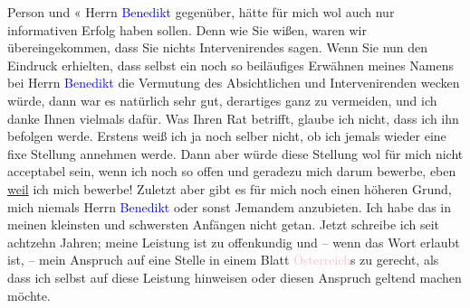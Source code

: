                Person und \label{K_L03553-3v}\label{K_L03553-3h}« Herrn
                  \textcolor{blue}{Benedikt}{}\ledrightnote{\textcolor{blue}{Moriz Benedikt}} gegenüber, hätte für mich wol auch
               nur informativen Erfolg haben sollen. Denn wie Sie wißen, waren wir übereingekommen,
               dass Sie nichts Intervenirendes sagen. Wenn Sie nun den Eindruck erhielten, dass
               selbst ein noch so beiläufiges Erwähnen meines Namens bei Herrn \textcolor{blue}{Benedikt}{}\ledrightnote{\textcolor{blue}{Moriz Benedikt}} die Vermutung des Absichtlichen und Intervenirenden
               wecken würde, dann war es natürlich sehr gut, derartiges ganz zu vermeiden, und ich
               danke Ihnen vielmals dafür. Was Ihren Rat betrifft, glaube ich nicht, dass ich ihn
               befolgen werde. Erstens weiß ich ja noch selber nicht, ob ich jemals wieder eine fixe
                  {\pb}Stellung annehmen werde.
               Dann aber würde diese Stellung wol für mich nicht acceptabel sein, wenn ich noch so
               offen und geradezu mich darum bewerbe, {\dotstwo} eben \uline{weil} ich mich bewerbe! Zuletzt aber gibt es für mich
               noch einen höheren Grund, mich \strikeout{\textcolor{gray}{×}\-\textcolor{gray}{×}\-\textcolor{gray}{×}\-\textcolor{gray}{×}\-\textcolor{gray}{×}\-\textcolor{gray}{×}\-\textcolor{gray}{×}\-\textcolor{gray}{×}\-\textcolor{gray}{×}\-\textcolor{gray}{×}\-\textcolor{gray}{×}\-\textcolor{gray}{×}\-\textcolor{gray}{×}\-\textcolor{gray}{×}\-\textcolor{gray}{×}\-\textcolor{gray}{×}\-\textcolor{gray}{×}\-\textcolor{gray}{×}\-\textcolor{gray}{×}\-\textcolor{gray}{×}} niemals Herrn \textcolor{blue}{Benedikt}{}\ledrightnote{\textcolor{blue}{Moriz Benedikt}} oder sonst
               Jemandem anzubieten. Ich habe das in meinen kleinsten und schwersten Anfängen nicht
               getan. Jetzt schreibe ich seit achtzehn Jahren; meine Leistung ist zu offenkundig und
               – wenn das Wort erlaubt ist, – mein Anspruch auf eine Stelle in einem Blatt \textcolor{pink}{Österreich}{}\ledrightnote{\textcolor{pink}{Österreich}}s zu gerecht, als dass ich selbst auf
               diese Leistung hinweisen oder diesen Anspruch geltend machen möchte.\pend
           
